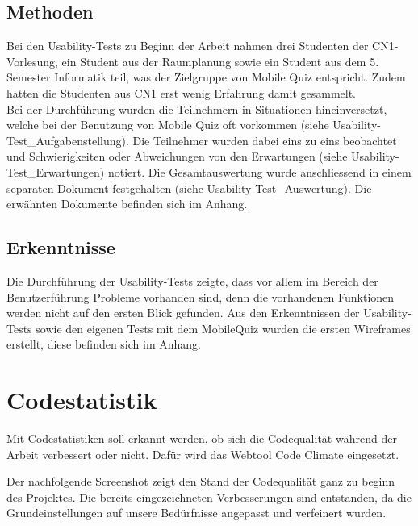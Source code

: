\subsection{Methoden}
Bei den \gls{Usability-Tests} zu Beginn der Arbeit nahmen drei Studenten der \acrfull{CN1}-Vorlesung, ein Student aus der Raumplanung sowie ein Student aus dem 5. Semester Informatik teil, was der Zielgruppe von Mobile Quiz entspricht. Zudem hatten die Studenten aus \acrshort{CN1} erst wenig Erfahrung damit gesammelt. \\
Bei der Durchführung wurden die Teilnehmern in Situationen hineinversetzt, welche bei der Benutzung von Mobile Quiz oft vorkommen (siehe Usability-Test\_Aufgabenstellung). Die Teilnehmer wurden dabei eins zu eins beobachtet und Schwierigkeiten oder Abweichungen von den Erwartungen (siehe Usability-Test\_Erwartungen) notiert. Die Gesamtauswertung wurde anschliessend in einem separaten Dokument festgehalten (siehe Usability-Test\_Auswertung). Die erwähnten Dokumente befinden sich im Anhang.

\subsection{Erkenntnisse}
Die Durchführung der \gls{Usability-Tests} zeigte, dass vor allem im Bereich der Benutzerführung Probleme vorhanden sind, denn die vorhandenen Funktionen werden nicht auf den ersten Blick gefunden.
Aus den Erkenntnissen der \gls{Usability-Tests} sowie den eigenen Tests mit dem MobileQuiz wurden die ersten \gls{Wireframes} erstellt, diese befinden sich im Anhang. 

\section{Codestatistik}
Mit Codestatistiken soll erkannt werden, ob sich die Codequalität während der Arbeit verbessert oder nicht. Dafür wird das Webtool Code Climate eingesetzt.

Der nachfolgende Screenshot zeigt den Stand der Codequalität ganz zu beginn des Projektes. Die bereits eingezeichneten Verbesserungen sind entstanden, da die Grundeinstellungen auf unsere Bedürfnisse angepasst und verfeinert wurden.

